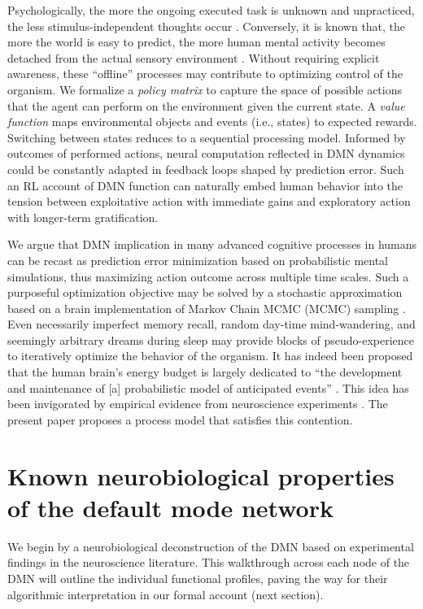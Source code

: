 \documentclass[10pt,letterpaper]{article}
\begin{document}
Psychologically,
the more the ongoing executed task is unknown and unpracticed,
the less stimulus-independent thoughts occur
\citep{filler1973daydreaming, teasdale1995stimulus, christoff2016mind}.
Conversely,
it is known that, the more the world is easy to predict,
the more human mental activity
becomes detached from the actual sensory environment
\citep{antrobus1966studies, pope1978regulation}.
Without requiring explicit awareness,
these ``offline'' processes may contribute
to optimizing control of the organism.
We formalize
a \textit{policy matrix} to capture the space of possible actions that
the agent can perform
on the environment given the current state. A \textit{value function}
maps environmental objects and events (i.e., states) to expected rewards.
Switching between states reduces to a sequential processing model.
Informed by outcomes of performed actions, neural computation reflected in
DMN dynamics could be constantly adapted in feedback loops
shaped by prediction error.
Such an RL account of DMN function can naturally embed human behavior
into the tension between exploitative action with immediate gains and
exploratory action with longer-term gratification.



We argue that DMN implication in many
advanced cognitive processes in humans
can be recast as prediction error minimization
based on probabilistic mental simulations,
thus maximizing action outcome across multiple time scales.
Such a purposeful optimization objective
may be solved by a stochastic approximation
based on a brain implementation of Markov Chain MCMC (MCMC) sampling
\citep{tenenbaum2011grow}.
Even necessarily imperfect memory recall,
random day-time mind-wandering, and
seemingly arbitrary dreams during sleep
may provide blocks of pseudo-experience to iteratively
optimize the behavior of the organism.
%
It has indeed been proposed that
the human brain's energy budget is largely dedicated to
``the development and maintenance of [a]
probabilistic model of anticipated events''
\citep{raichle2005intrinsic}.
This idea has been invigorated by
empirical evidence from
neuroscience experiments \citep{kording2004bayesian, fiser2004small}.
The present paper proposes a
process model that satisfies this contention.




\section{Known neurobiological properties of the default mode network}
We begin by a neurobiological deconstruction of the DMN
based on experimental findings in the neuroscience literature.
This walkthrough across each node of the DMN will
outline the individual functional profiles,
paving the way for their algorithmic interpretation
in our formal account (next section).
\end{document}
